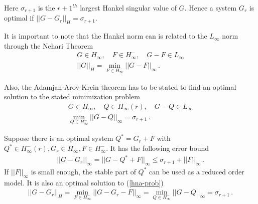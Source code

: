Here \(\sigma_{r+1}\) is the \(r+1^{th}\) largest Hankel singular value of \(G\).
Hence a system \(G_r\) is optimal if \(||G - G_r||_H = \sigma_{r+1}\).

It is important to note that the Hankel norm can is related to the \(L_{\infty}\) norm through the Nehari Theorem
\begin{gather}
G \in H_{\infty}, \quad F \in H_{\infty}^-, \quad G - F \in L_{\infty} \\
||G||_H = \min_{F \in H^{-}_{\infty}} ||G - F||_{\infty} \,.
\end{gather}

Also, the Adamjan-Arov-Krein theorem has to be stated to find an optimal solution to the stated minimization problem
\begin{gather}
G \in H_{\infty}, \quad Q \in H_{\infty}^-(r), \quad G - Q \in L_{\infty} \\
\min_{Q \in H_{\infty}^{-}} ||G-Q||_{\infty} = \sigma_{r+1} \,.
\end{gather}

Suppose there is an optimal system \(Q^{*} = G_r + F\) with \(Q^{*}  \in H_{\infty}^-(r), G_r \in H_{\infty}, F \in H_{\infty}^-\).
It has the following error bound
\begin{gather}
||G - G_r||_{\infty} = ||G - Q^{*} + F||_{\infty} \leq \sigma_{r+1} + ||F||_{\infty}\,. \label{fmin}
\end{gather}
If \(||F||_{\infty}\) is small enough, the stable part of \(Q^{*}\) can be used as a reduced order model.
It is also an optimal solution to (\ref{hna-prob}) 
\cite{sandberg}
\begin{gather}
||G - G_r||_H = \min_{F \in H^{-}_{\infty}} ||G - G_r - F||_{\infty} = \min_{Q \in H_{\infty}^{-}} ||G-Q||_{\infty} = \sigma_{r+1} \,.
\end{gather}

